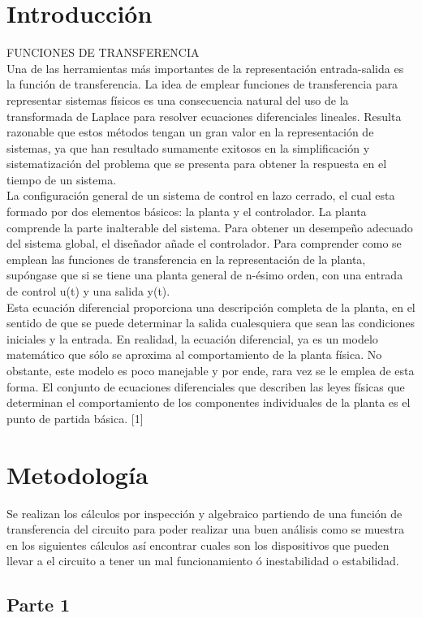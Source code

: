 \documentclass[12pt]{report}
\begin{document}
\chapter{Introducción}
 FUNCIONES DE TRANSFERENCIA\\
Una de las herramientas más importantes de la representación entrada-salida es la
función de transferencia. La idea de emplear funciones de transferencia para
representar sistemas físicos es una consecuencia natural del uso de la transformada de
Laplace para resolver ecuaciones diferenciales lineales. Resulta razonable que estos
métodos tengan un gran valor en la representación de sistemas, ya que han resultado
sumamente exitosos en la simplificación y sistematización del problema que se presenta
para obtener la respuesta en el tiempo de un sistema.\\
La configuración general de un sistema de control en lazo cerrado, el cual esta formado por dos elementos básicos: la planta y el controlador.
La planta comprende la parte inalterable del sistema. Para obtener un desempeño
adecuado del sistema global, el diseñador añade el controlador. Para comprender como se
emplean las funciones de transferencia en la representación de la planta, supóngase que
si se tiene una planta general de n-ésimo orden, con una entrada de control u(t) y una
salida y(t).\\
Esta ecuación diferencial proporciona una descripción completa de la planta, en el
sentido de que se puede determinar la salida cualesquiera que sean las condiciones
iniciales y la entrada. En realidad, la ecuación diferencial, ya es un modelo matemático
que sólo se aproxima al comportamiento de la planta física. No obstante, este modelo es
poco manejable y por ende, rara vez se le emplea de esta forma.
 El conjunto de ecuaciones diferenciales que describen las leyes físicas que
determinan el comportamiento de los componentes individuales de la planta es el punto de
partida básica. [1]

\chapter{Metodología}
Se realizan los cálculos por inspección y algebraico partiendo de una función de transferencia del circuito para poder realizar una buen análisis como se muestra en los siguientes cálculos así encontrar cuales son los dispositivos que pueden llevar a el circuito a tener un mal funcionamiento ó inestabilidad o estabilidad.
\section{Parte 1}
\end{document}
